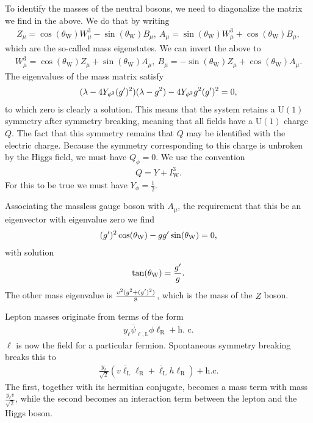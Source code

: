 To identify the masses of the neutral bosons, we need to diagonalize the matrix we find in the above. We do that by writing
\begin{align*}
	Z_{\mu} = \cos(\theta_{\text{W}})W_{\mu}^{3} - \sin(\theta_{\text{W}})B_{\mu},\ A_{\mu} = \sin(\theta_{\text{W}})W_{\mu}^{3} + \cos(\theta_{\text{W}})B_{\mu},
\end{align*}
which are the so-called mass eigenstates. We can invert the above to
\begin{align*}
	W_{\mu}^{3} = \cos(\theta_{\text{W}})Z_{\mu} + \sin(\theta_{\text{W}})A_{\mu},\ B_{\mu} = -\sin(\theta_{\text{W}})Z_{\mu} + \cos(\theta_{\text{W}})A_{\mu}.
\end{align*}
The eigenvalues of the mass matrix satisfy
\begin{align*}
	(\lambda - 4Y_{\phi^{2}}(g^{\prime})^{2})(\lambda - g^{2}) - 4Y_{\phi^{2}}g^{2}(g^{\prime})^{2} = 0,
\end{align*}
to which zero is clearly a solution. This means that the system retains a $\text{U}(1)$ symmetry after symmetry breaking, meaning that all fields have a $\text{U}(1)$ charge $Q$. The fact that this symmetry remains that $Q$ may be identified with the electric charge. Because the symmetry corresponding to this charge is unbroken by the Higgs field, we must have $Q_{\phi} = 0$. We use the convention
\begin{align*}
	Q = Y + I_{\text{W}}^{3}.
\end{align*}
For this to be true we must have $Y_{\phi} = \frac{1}{2}$.

Associating the massless gauge boson with $A_{\mu}$, the requirement that this be an eigenvector with eigenvalue zero we find
\begin{align*}
	(g^{\prime})^{2}\cos(\theta_{\text{W}}) - gg^{\prime}\sin(\theta_{\text{W}}) = 0,
\end{align*}
with solution
\begin{align*}
	\tan(\theta_{\text{W}}) = \frac{g^{\prime}}{g}.
\end{align*}
The other mass eigenvalue is $\frac{v^{2}(g^{2} + (g^{\prime})^{2})}{8}$, which is the mass of the $Z$ boson.

Lepton masses originate from terms of the form
\begin{align*}
	y_{\ell}\overline{\psi}_{\ell, \text{L}}\phi\ell_{\text{R}} + \text{h. c.}
\end{align*}
$\ell$ is now the field for a particular fermion. Spontaneous symmetry breaking breaks this to
\begin{align*}
	\frac{y_{\ell}}{\sqrt{2}}(v\overline{\ell}_{\text{L}}\ell_{\text{R}} + \overline{\ell}_{\text{L}}h\ell_{\text{R}}) + \text{h.c.}
\end{align*}
The first, together with its hermitian conjugate, becomes a mass term with mass $\frac{y_{\ell}v}{\sqrt{2}}$, while the second becomes an interaction term between the lepton and the Higgs boson.

